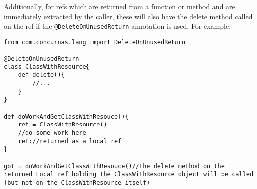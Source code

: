 \documentclass[conc-doc]{subfiles}
\begin{document}
Additionally, for refs which are returned from a function or method and are immediately extracted by the caller, these will also have the delete method called on the ref if the \lstinline{@DeleteOnUnusedReturn} annotation is used. For example:

\begin{lstlisting}
from com.concurnas.lang import DeleteOnUnusedReturn

@DeleteOnUnusedReturn
class ClassWithResource{
	def delete(){
		//...
	}
}

def doWorkAndGetClassWithResouce(){
	ret = ClassWithResource()
	//do some work here
	ret://returned as a local ref
}

got = doWorkAndGetClassWithResouce()//the delete method on the returned Local ref holding the ClassWithResource object will be called (but not on the ClassWithResource itself)
\end{lstlisting}
\end{document}
